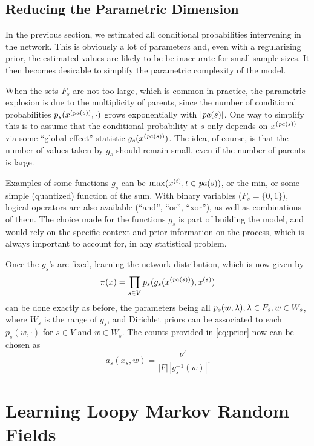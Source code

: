 \subsection{Reducing the Parametric Dimension}

In the previous section, we estimated all  conditional
probabilities intervening in the network. This is obviously a lot of
parameters and, even with a regularizing prior, the estimated values
are likely to be be inaccurate for small sample sizes. It then becomes desirable to simplify the parametric complexity of the
model. 

When the sets $F_s$ are not too large, which is common in
practice, the parametric explosion is due to the multiplicity of
parents, since the number of conditional probabilities $p_s(x^{({\mathit{pa}(s)})}, \cdot)$
grows exponentially with $|{\mathit{pa}(s)}|$. One way to simplify this is to assume that the conditional
probability at $s$ only depends on $x^{({\mathit{pa}(s)})}$ via some ``global-effect''
statistic $g_s(x^{({\mathit{pa}(s)})})$. The idea, of course, is that the number of
values taken by $g_s$ should remain small, even if the number of parents is
large.

Examples of some functions $g_s$ can be $\max(x^{(t)}, t\in {\mathit{pa}(s)})$, or the
min, or some simple (quantized) function of the sum. With binary
variables ($F_s=\{0,1\}$), logical operators are also available (``and'',
``or'', ``xor''), as well as combinations of them. The choice made for the
functions $g_s$ is part of building the model, and would rely on
the specific context and prior information on the process, which
is always important to account for, in any statistical problem.

Once the $g_s$'s are fixed, learning the network distribution, which is
now given by
$$
\pi(x) = \prod_{s\in V} p_s(g_s(x^{({\mathit{pa}(s)})}), x^{(s)})
$$
can be done exactly as before, the parameters being all $p_s(w, \lambda),
\lambda\in F_s, w\in W_s$, where $W_s$ is the range of $g_s$, and
Dirichlet priors can be associated to each $p_s(w, \cdot)$ for $s\in V$ and
$w\in W_s$. The counts provided in \cref{eq:prior} now can be chosen
as
\begin{equation}
\label{eq:prior2}
a_s(x_s, w) =  \frac{\nu'}{|F|\,|g_s^{-1}(w)|}.
\end{equation}




\section{Learning Loopy Markov Random Fields}

